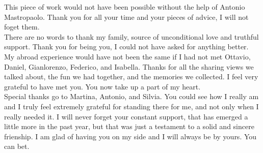 \begin{acknowledgements}
This piece of work would not have been possible without the help of Antonio Mastropaolo. 
Thank you for all your time and your pieces of advice, I will not foget them.\\

There are no words to thank my family, source of unconditional love and truthful support. 
Thank you for being you, I could not have asked for anything better.\\

My abroad experience would have not been the same if I had not met Ottavio, Daniel, Gianlorenzo, Federico, and Isabella. 
Thanks for all the sharing views we talked about, the fun we had together, and the memories we collected. I feel very grateful to have met you.
You now take up a part of my heart.\\

Special thanks go to Martina, Antonio, and Silvia. 
You could see how I really am and I truly feel extremely grateful 
for standing there for me, and not only when I really needed it. 
I will never forget your constant support, that has emerged a little more in the past year, but that was 
just a testament to a solid and sincere frienship. I am glad of having you on my side and I will always be by yours.
You can bet.












\end{acknowledgements}